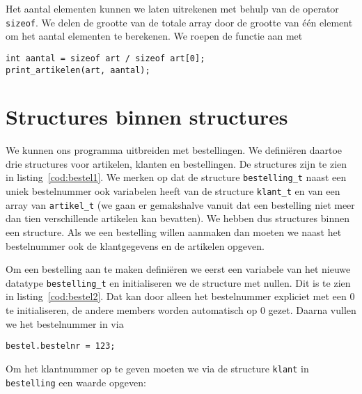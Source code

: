 
Het aantal elementen kunnen we laten uitrekenen met behulp van de operator \texttt{sizeof}. We delen de grootte van de totale array door de grootte van één element om het aantal elementen te berekenen.
We roepen de functie aan met

\begin{lstlisting}[style=lstoneline]
int aantal = sizeof art / sizeof art[0];
print_artikelen(art, aantal);
\end{lstlisting}


\section{Structures binnen structures}
We kunnen ons programma uitbreiden met bestellingen. We definiëren daartoe drie structures voor artikelen, klanten en bestellingen. De structures zijn te zien in listing~\ref{cod:bestel1}. We merken op dat de structure \texttt{bestelling\_t} naast een uniek bestelnummer ook variabelen heeft van de structure \texttt{klant\_t} en van een array van \texttt{artikel\_t} (we gaan er gemakshalve vanuit dat een bestelling niet meer dan tien verschillende artikelen kan bevatten). We hebben dus structures binnen een structure. Als we een bestelling willen aanmaken dan moeten we naast het bestelnummer ook de klantgegevens en de artikelen opgeven.


Om een bestelling aan te maken definiëren we eerst een variabele van het nieuwe datatype \texttt{bestelling\_t} en initialiseren we de structure met nullen. Dit is te zien in listing~\ref{cod:bestel2}. Dat kan door alleen het bestelnummer expliciet met een 0 te initialiseren, de andere members worden automatisch op 0 gezet. Daarna vullen we het bestelnummer in via

\hspace*{1em}\texttt{bestel.bestelnr = 123;}

Om het klantnummer op te geven moeten we via de structure \texttt{klant} in \texttt{bestelling} een waarde opgeven:

